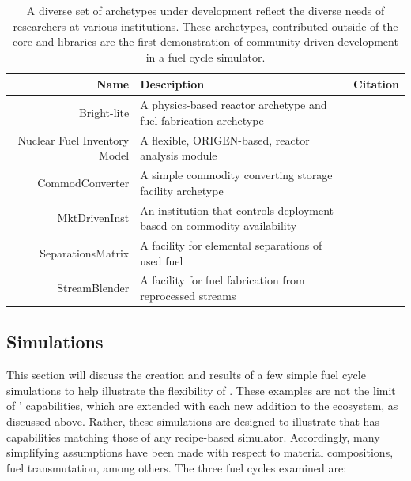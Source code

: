 \begin{table}[h]
\centering
\begin{tabularx}{\textwidth}{|r|X|r|}
\hline
\textbf{Name} & \textbf{Description} & \textbf{Citation} \\
\hline
Bright-lite & A physics-based reactor archetype and fuel fabrication archetype & \cite{flanagan_bright-lite_2014} \\
Nuclear Fuel Inventory Model & A flexible, ORIGEN-based, reactor analysis module & \cite{skutnik_development_2015} \\
CommodConverter & A simple commodity converting storage facility archetype  & \cite{huff_commodconverter_2014} \\
MktDrivenInst & An institution that controls deployment based on commodity availability & \cite{huff_mktdriveninst_2014} \\
SeparationsMatrix & A facility for elemental separations of used fuel & \cite{huff_streamblender_2014} \\
StreamBlender & A facility for fuel fabrication from reprocessed streams & \cite{huff_streamblender_2014} \\
\hline
\end{tabularx}
\caption{A diverse set of archetypes under development reflect the diverse
needs of researchers at various institutions. These archetypes, contributed
outside of the \Cyclus core and \Cycamore libraries are the first demonstration
of community-driven development in a fuel cycle simulator.}
\label{tab:archetypes}
\end{table}

\subsection{Simulations}
\label{ref:simulations}


This section will discuss the creation and results of a few simple fuel cycle
simulations to help illustrate the flexibility of \Cyclus. These examples are
not the limit of \Cyclus' capabilities, which are extended with each new
addition to the ecosystem, as discussed above.  Rather, these simulations are
designed to illustrate that \Cyclus has capabilities matching those of any
recipe-based simulator. Accordingly, many simplifying assumptions have been
made with respect to material compositions, fuel transmutation, among others.
The three fuel cycles examined are:


